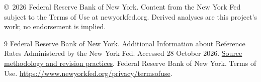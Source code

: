 \documentclass[11pt]{article}
\begin{document}
\noindent\small\copyright\ 2026 Federal Reserve Bank of New York. Content from the New York Fed subject to the Terms of Use at newyorkfed.org. Derived analyses are this project's work; no endorsement is implied.\normalsize
\begingroup\small\begin{thebibliography}{9}\setlength{\itemsep}{2pt}
 Federal Reserve Bank of New York. Additional Information about Reference Rates Administered by the New York Fed. Accessed 28 October 2026. \href{https://www.newyorkfed.org/markets/reference-rates/additional-information-about-reference-rates}{Source methodology and revision practices}.
 Federal Reserve Bank of New York. Terms of Use. \url{https://www.newyorkfed.org/privacy/termsofuse}.
\end{thebibliography}\endgroup
\end{document}
